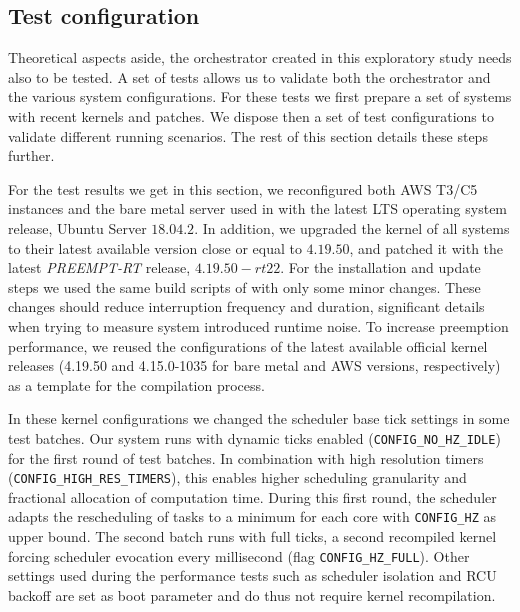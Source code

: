 \documentclass[]{scrartcl}
\begin{document}

\subsection{Test configuration}
\label{sub:testcfg}

Theoretical aspects aside, the orchestrator created in this exploratory study needs also to be tested.
A set of tests allows us to validate both the orchestrator and the various system configurations.
For these tests we first prepare a set of systems with recent kernels and patches.
We dispose then a set of test configurations to validate different running scenarios. 
The rest of this section details these steps further.

For the test results we get in this section, we reconfigured both AWS T3/C5 instances and the bare metal server used in \cite{Hoferetal2019} with the latest LTS operating system release, Ubuntu Server $18.04.2$.
In addition, we upgraded the kernel of all systems to their latest available version close or equal to $4.19.50$, and patched it with the latest \emph{PREEMPT-RT} release, $4.19.50-rt22$.
For the installation and update steps we used the same build scripts of \cite{Hoferetal2019} with only some minor changes.
These changes should reduce interruption frequency and duration, significant details when trying to measure system introduced runtime noise.
To increase preemption performance, we reused the configurations of the latest available official kernel releases (4.19.50 and 4.15.0-1035 for bare metal and AWS versions, respectively) as a template for the compilation process.

In these kernel configurations we changed the scheduler base tick settings in some test batches.
Our system runs with dynamic ticks enabled (\texttt{CONFIG\_NO\_HZ\_IDLE}) for the first round of test batches.
In combination with high resolution timers (\texttt{CONFIG\_HIGH\_RES\_TIMERS}), this enables higher scheduling granularity and fractional allocation of computation time.
During this first round, the scheduler adapts the rescheduling of tasks to a minimum for each core with \texttt{CONFIG\_HZ} as upper bound. 
The second batch runs with full ticks, a second recompiled kernel forcing scheduler evocation every millisecond (flag \texttt{CONFIG\_HZ\_FULL}).
Other settings used during the performance tests such as scheduler isolation and RCU backoff are set as boot parameter and do thus not require kernel recompilation.
\end{document}
